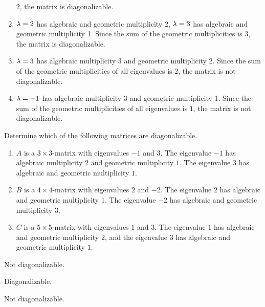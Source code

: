 \begin{ex}
\begin{sol}
\begin{enumerate}
      $2$, the matrix is diagonalizable.
    \item $\lambda=2$ has algebraic and geometric
      multiplicity 2, $\lambda=3$ has algebraic and geometric
      multiplicity 1. Since the sum of the geometric multiplicities is
      $3$, the matrix is diagonalizable.
    \item $\lambda=3$ has algebraic multiplicity 3 and geometric
      multiplicity 2. Since the sum of the geometric multiplicities of
      all eigenvalues is $2$, the matrix is not diagonalizable.
    \item $\lambda = -1$ has algebraic multiplicity 3 and geometric
      multiplicity 1. Since the sum of the geometric multiplicities of
      all eigenvalues is $1$, the matrix is not diagonalizable.
    \end{enumerate}
  \end{sol}
\end{ex}

\begin{ex}
  Determine which of the following matrices are diagonalizable.
  \begin{enumerate}
  \item $A$ is a $3\times 3$-matrix with eigenvalues $-1$ and $3$. The
    eigenvalue $-1$ has algebraic multiplicity $2$ and geometric
    multiplicity $1$. The eigenvalue $3$ has algebraic and geometric
    multiplicity $1$.
  \item $B$ is a $4\times 4$-matrix with eigenvalues $2$ and $-2$. The
    eigenvalue $2$ has algebraic and geometric multiplicity $1$. The
    eigenvalue $-2$ has algebraic and geometric multiplicity $3$.
  \item $C$ is a $5\times 5$-matrix with eigenvalues $1$ and $3$. The
    eigenvalue $1$ has algebraic and geometric multiplicity $2$, and
    the eigenvalue $3$ has algebraic and geometric multiplicity $1$.
  \end{enumerate}
  \begin{sol}
  \item Not diagonalizable.
  \item Diagonalizable.
  \item Not diagonalizable.
  \end{sol}
\end{ex}

